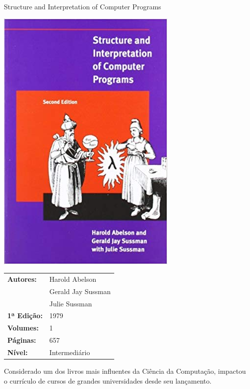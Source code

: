 \begin{frame}[fragile]{Structure and Interpretation of Computer Programs}

    \begin{minipage}{0.4\textwidth}
        \includegraphics[scale=0.25]{harold.jpg}
    \end{minipage}
    \begin{minipage}{0.5\textwidth}
        \begin{small}
            \begin{tabularx}{0.95\textwidth}{lX}
                \textbf{Autores:} & Harold Abelson \\
                & Gerald Jay Sussman \\
                & Julie Sussman \\
                \textbf{1ª Edição:} & 1979 \\
                \textbf{Volumes:} & 1 \\
                \textbf{Páginas:} & 657 \\
                \textbf{Nível:} & Intermediário \\
            \end{tabularx}
        \end{small}
    \end{minipage}

    \vspace{0.2in} 

    Considerado um dos livros mais influentes da Ciência da Computação, impactou o
    currículo de cursos de grandes universidades desde seu lançamento.

\end{frame}

